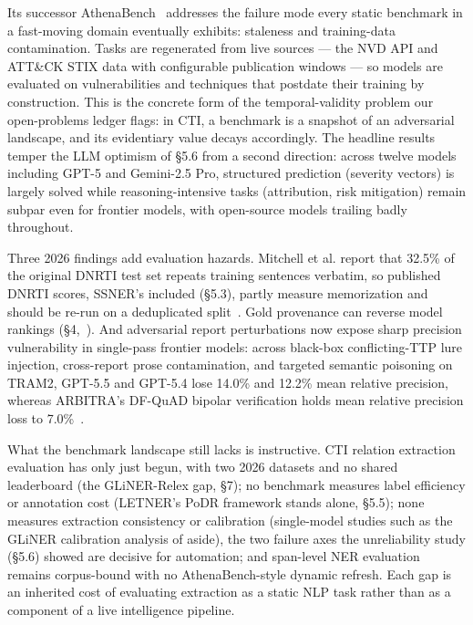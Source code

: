 \documentclass[11pt]{article}
\begin{document}
Its successor AthenaBench~\citep{alam2025athenabench} addresses the failure mode every static benchmark in a fast-moving domain eventually exhibits: staleness and training-data contamination. Tasks are regenerated from live sources — the NVD API and ATT\&CK STIX data with configurable publication windows — so models are evaluated on vulnerabilities and techniques that postdate their training by construction. This is the concrete form of the temporal-validity problem our open-problems ledger flags: in CTI, a benchmark is a snapshot of an adversarial landscape, and its evidentiary value decays accordingly. The headline results temper the LLM optimism of §5.6 from a second direction: across twelve models including GPT-5 and Gemini-2.5 Pro, structured prediction (severity vectors) is largely solved while reasoning-intensive tasks (attribution, risk mitigation) remain subpar even for frontier models, with open-source models trailing badly throughout.

Three 2026 findings add evaluation hazards. Mitchell et al. report that 32.5\% of the original DNRTI test set repeats training sentences verbatim, so published DNRTI scores, SSNER's included (§5.3), partly measure memorization and should be re-run on a deduplicated split~\citep{mitchell2026lora}. Gold provenance can reverse model rankings (§4,~\citealp{chaganti2026ondevice}).
And adversarial report perturbations now expose sharp precision vulnerability in single-pass frontier models: across black-box conflicting-TTP lure injection, cross-report prose contamination, and targeted semantic poisoning on TRAM2, GPT-5.5 and GPT-5.4 lose 14.0\% and 12.2\% mean relative precision, whereas ARBITRA's DF-QuAD bipolar verification holds mean relative precision loss to 7.0\%~\citep{jin2026arbitra}.

What the benchmark landscape still lacks is instructive. CTI relation extraction evaluation has only just begun, with two 2026 datasets and no shared leaderboard (the GLiNER-Relex gap, §7); no benchmark measures label efficiency or annotation cost (LETNER's PoDR framework stands alone, §5.5); none measures extraction consistency or calibration (single-model studies such as the GLiNER calibration analysis of \citealp{chaganti2026ondevice} aside), the two failure axes the unreliability study (§5.6) showed are decisive for automation; and span-level NER evaluation remains corpus-bound with no AthenaBench-style dynamic refresh. Each gap is an inherited cost of evaluating extraction as a static NLP task rather than as a component of a live intelligence pipeline.
\end{document}
